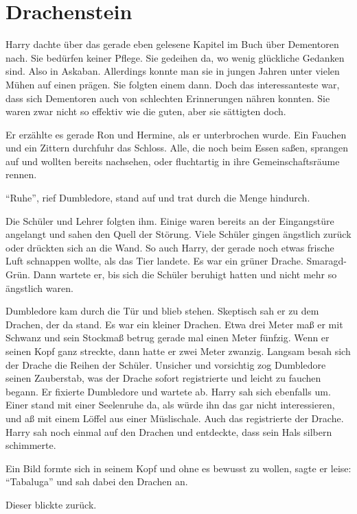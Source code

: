 \chapter{Drachenstein}


Harry dachte über das gerade eben gelesene Kapitel im Buch über Dementoren nach. Sie bedürfen keiner Pflege. Sie gedeihen da, wo wenig glückliche Gedanken sind. Also in Askaban. Allerdings konnte man sie in jungen Jahren unter vielen Mühen auf einen prägen. Sie folgten einem dann. Doch das interessanteste war, dass sich Dementoren auch von schlechten Erinnerungen nähren konnten. Sie waren zwar nicht so effektiv wie die guten, aber sie sättigten doch.

Er erzählte es gerade Ron und Hermine, als er unterbrochen wurde. Ein Fauchen und ein Zittern durchfuhr das Schloss. Alle, die noch beim Essen saßen, sprangen auf und wollten bereits nachsehen, oder fluchtartig in ihre Gemeinschaftsräume rennen.

\enquote{Ruhe}, rief Dumbledore, stand auf und trat durch die Menge hindurch.

Die Schüler und Lehrer folgten ihm. Einige waren bereits an der Eingangstüre angelangt und sahen den Quell der Störung. Viele Schüler gingen ängstlich zurück oder drückten sich an die Wand. So auch Harry, der gerade noch etwas frische Luft schnappen wollte, als das Tier landete. Es war ein grüner Drache. Smaragd-Grün. Dann wartete er, bis sich die Schüler beruhigt hatten und nicht mehr so ängstlich waren.

Dumbledore kam durch die Tür und blieb stehen. Skeptisch sah er zu dem Drachen, der da stand. Es war ein kleiner Drachen. Etwa drei Meter maß er mit Schwanz und sein Stockmaß betrug gerade mal einen Meter fünfzig. Wenn er seinen Kopf ganz streckte, dann hatte er zwei Meter zwanzig. Langsam besah sich der Drache die Reihen der Schüler. Unsicher und vorsichtig zog Dumbledore seinen Zauberstab, was der Drache sofort registrierte und leicht zu fauchen begann. Er fixierte Dumbledore und wartete ab. Harry sah sich ebenfalls um. Einer stand mit einer Seelenruhe da, als würde ihn das gar nicht interessieren, und aß mit einem Löffel aus einer Müslischale. Auch das registrierte der Drache. Harry sah noch einmal auf den Drachen und entdeckte, dass sein Hals silbern schimmerte.

Ein Bild formte sich in seinem Kopf und ohne es bewusst zu wollen, sagte er leise: \enquote{Tabaluga} und sah dabei den Drachen an.

Dieser blickte zurück. 

